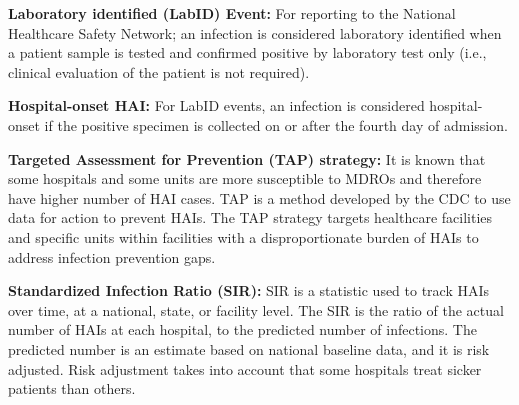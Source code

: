   

{\bf Laboratory identified (LabID) Event:} For reporting to the National Healthcare Safety Network; an infection is considered laboratory
identified when a patient sample is tested and confirmed positive by laboratory test only (i.e., clinical evaluation of the patient is not required).

{\bf Hospital-onset HAI:} For LabID events, an infection is considered hospital-onset if the positive specimen is collected on or after the fourth day of admission.

{\bf Targeted Assessment for Prevention (TAP) strategy:} It is known that some hospitals and some units are more susceptible to MDROs and therefore have higher number of HAI cases. TAP is a method developed by the CDC to use data for action to prevent HAIs. The TAP strategy targets healthcare facilities and specific units within facilities with a disproportionate burden of
HAIs to address infection prevention gaps.

{\bf Standardized Infection Ratio (SIR):} SIR is a statistic used to track HAIs over time, at a national, state, or facility level. The SIR is the ratio of the actual number of HAIs at each hospital, to the predicted number of infections. The predicted number is an estimate based on national baseline data, and it is risk adjusted. Risk adjustment takes into account that some hospitals treat sicker patients than others.







